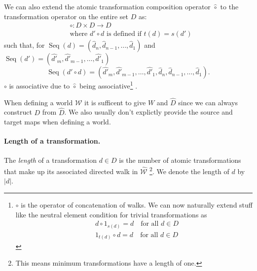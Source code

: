 We can also extend the atomic transformation composition operator $\hat{\circ}$ to the transformation operator on the entire set $D$ as:
\begin{equation}
\begin{aligned}
	& \circ: D \times D \to D \\
	& \text{where $d' \circ d$ is defined if $t(d) = s(d')$}
\end{aligned}
\end{equation}
such that, for $\operatorname{Seq}(d) = (\hat{d}_{n}, \hat{d}_{n-1}, \dots, \hat{d}_{1})$ and $\operatorname{Seq}(d') = (\hat{d'}_{m}, \hat{d'}_{m-1}, \dots, \hat{d'}_{1})$
\begin{equation}
	\operatorname{Seq}(d' \circ d) = (\hat{d'}_{m}, \hat{d'}_{m-1}, \dots, \hat{d'}_{1}, \hat{d}_{n}, \hat{d}_{n-1}, \dots, \hat{d}_{1}).
\end{equation}
$\circ$ is associative due to $\hat{\circ}$ being associative\footnote{
$\circ$ is the operator of concatenation of walks.
	We can now naturally extend stuff like the neutral element condition for trivial transformations as
	\begin{align}
		& d \circ 1_{s(d)} = d \quad \text{for all $d \in D$} \\
		& 1_{t(d)} \circ d = d \quad \text{for all $d \in D$}
	\end{align}
}
.

\begin{definition}
	When defining a world $\mathscr{W}$ it is sufficent to give $W$ and $\hat{D}$ since we can always construct $D$ from $\hat{D}$.
	We also usually don't explictly provide the source and target maps when defining a world.
\end{definition}



\paragraph{Length of a transformation.}
The \emph{length} of a transformation $d \in D$ is the number of atomic transformations that make up its associated directed walk in $\hat{\mathscr{W}}$ \footnote{
	This means minimum transformations have a length of one.
}.
We denote the length of $d$ by $|d|$.





